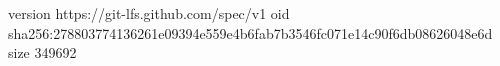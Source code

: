 version https://git-lfs.github.com/spec/v1
oid sha256:278803774136261e09394e559e4b6fab7b3546fc071e14c90f6db08626048e6d
size 349692
